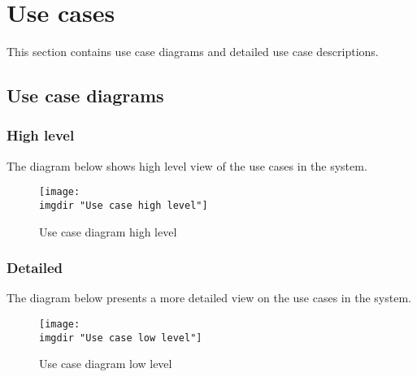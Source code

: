 \section{Use cases}
This section contains use case diagrams and detailed use case descriptions.

\subsection{Use case diagrams}
\subsubsection{High level}
The diagram below shows high level view of the use cases in the system. 
\begin{figure}[H]
\texttt{[image: \\imgdir "Use case high level"]}
\centering
\caption{Use case diagram high level}
\label{fig:use_case_high_level}
\end{figure}

\subsubsection{Detailed}
The diagram below presents a more detailed view on the use cases in the system.
\begin{figure}[H]
\texttt{[image: \\imgdir "Use case low level"]}
\centering
\caption{Use case diagram low level}
\label{fig:use_case_low_level}
\end{figure}

